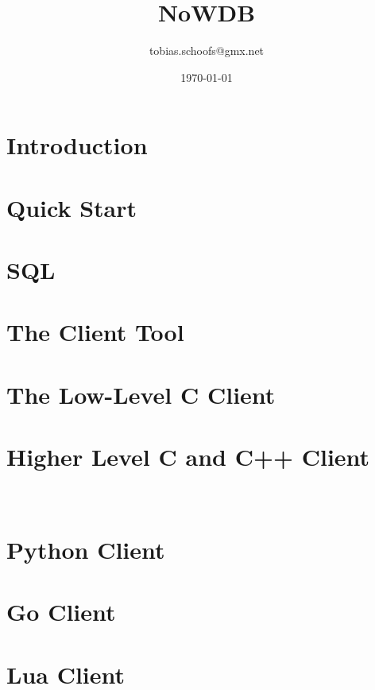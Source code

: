 \documentclass{scrreprt}
\begin{document}
\setlength{\parindent}{0pt}
\setlength{\parskip}{8pt}

\title {NoWDB}
\author {tobias.schoofs@gmx.net}
\date{\today}
\maketitle
\tableofcontents

\chapter{Introduction}\label{chpt_intro} 

\chapter{Quick Start}\label{chpt_quickst}


\chapter{SQL}\label{chpt_sql}

\chapter{The Client Tool}\label{chpt_clienttool}

\chapter{The Low-Level C Client}\label{chpt_llc}

\chapter{Higher Level C and C++ Client}\label{chpt_ccpp}
\CC\

\chapter{Python Client}\label{chpt_pythonclient}

\chapter{Go Client}\label{chpt_goclient}

\chapter{Lua Client}\label{chpt_luaclient}
\end{document}
